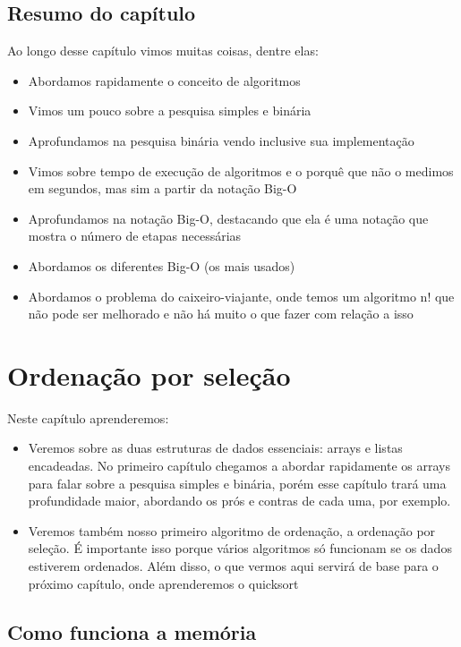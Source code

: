 \documentclass{report}
\begin{document}
	\section{Resumo do capítulo}
	
	Ao longo desse capítulo vimos muitas coisas, dentre elas:
	
	\begin{itemize}
		\item Abordamos rapidamente o conceito de algoritmos
		\item Vimos um pouco sobre a pesquisa simples e binária
		\item Aprofundamos na pesquisa binária vendo inclusive sua implementação
		\item Vimos sobre tempo de execução de algoritmos e o porquê que não o medimos em segundos, mas sim a partir da notação Big-O
		\item Aprofundamos na notação Big-O, destacando que ela é uma notação que mostra o número de etapas necessárias
		\item Abordamos os diferentes Big-O (os mais usados)
		\item Abordamos o problema do caixeiro-viajante, onde temos um algoritmo n! que não pode ser melhorado e não há muito o que fazer com relação a isso
	\end{itemize}
	
	\chapter{Ordenação por seleção}
	
	Neste capítulo aprenderemos:
	
	\begin{itemize}
		\item Veremos sobre as duas estruturas de dados essenciais: arrays e listas encadeadas. No primeiro capítulo chegamos a abordar rapidamente os arrays para falar sobre a pesquisa simples e binária, porém esse capítulo trará uma profundidade maior, abordando os prós e contras de cada uma, por exemplo.
		\item Veremos também nosso primeiro algoritmo de ordenação, a ordenação por seleção. É importante isso porque vários algoritmos só funcionam se os dados estiverem ordenados. Além disso, o que vermos aqui servirá de base para o próximo capítulo, onde aprenderemos o quicksort
	\end{itemize}
	
	\section{Como funciona a memória}
	
\end{document}
